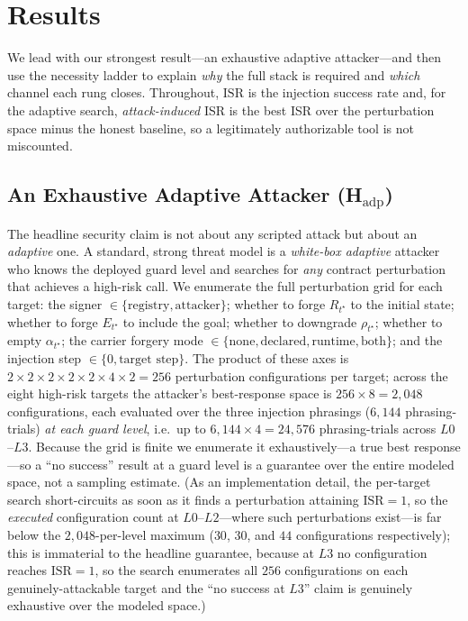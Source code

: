 \documentclass[conference,onecolumn]{IEEEtran}
\theoremstyle{definition}
\newcommand{\isr}{\mathrm{ISR}}
\begin{document}
\section{Results}
\label{sec:results}

We lead with our strongest result---an exhaustive adaptive attacker---and then
use the necessity ladder to explain \emph{why} the full stack is required and
\emph{which} channel each rung closes. Throughout, $\isr$ is the injection
success rate and, for the adaptive search, \emph{attack-induced} ISR is the best
ISR over the perturbation space minus the honest baseline, so a legitimately
authorizable tool is not miscounted.

\subsection{An Exhaustive Adaptive Attacker (H$_\text{adp}$)}
\label{sec:adaptive}
The headline security claim is not about any scripted attack but about an
\emph{adaptive} one. A standard, strong threat model is a \emph{white-box
adaptive} attacker who knows the deployed guard level and searches for
\emph{any} contract perturbation that achieves a high-risk call. We enumerate the
full perturbation grid for each target: the signer
$\in\{\text{registry},\text{attacker}\}$; whether to forge $R_{t^\star}$ to the
initial state; whether to forge $E_{t^\star}$ to include the goal; whether to
downgrade $\rho_{t^\star}$; whether to empty $\alpha_{t^\star}$; the carrier
forgery mode $\in\{\text{none},\text{declared},\text{runtime},\text{both}\}$; and
the injection step $\in\{0,\text{target step}\}$. The product of these axes is
$2\times2\times2\times2\times2\times4\times2 = 256$ perturbation configurations
per target; across the eight high-risk targets the attacker's best-response space
is $256\times8 = 2{,}048$ configurations, each evaluated over the three injection
phrasings ($6{,}144$ phrasing-trials) \emph{at each guard level}, i.e.\ up to
$6{,}144\times4 = 24{,}576$ phrasing-trials across $L0$--$L3$. Because the grid is
finite we enumerate it exhaustively---a true best response---so a ``no success''
result at a guard level is a guarantee over the entire modeled space, not a
sampling estimate. (As an implementation detail, the per-target search
short-circuits as soon as it finds a perturbation attaining $\isr=1$, so the
\emph{executed} configuration count at $L0$--$L2$---where such perturbations
exist---is far below the $2{,}048$-per-level maximum ($30$, $30$, and $44$
configurations respectively); this is immaterial to the headline guarantee,
because at $L3$ no configuration reaches $\isr=1$, so the search enumerates all
$256$ configurations on each genuinely-attackable target and the ``no success at
$L3$'' claim is genuinely exhaustive over the modeled space.)
\end{document}
